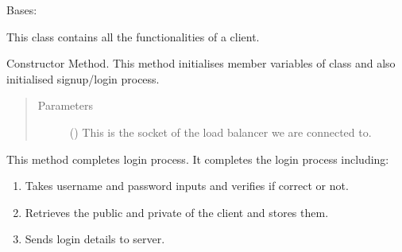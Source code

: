 \documentclass[letterpaper,10pt,english]{sphinxmanual}
\begin{document}
\begin{fulllineitems}
\label{\detokenize{clientHelper:clientHelper.Client}}
Bases: 

This class contains all the functionalities of a client.

\begin{fulllineitems}
\label{\detokenize{clientHelper:clientHelper.Client.__init__}}
Constructor Method.
This method initialises member variables of class and also initialised signup/login process.
\begin{quote}\begin{description}
\item[{Parameters}] \leavevmode
{} () \textendash{} This is the socket of the load balancer we are connected to.

\end{description}\end{quote}

\end{fulllineitems}


\begin{fulllineitems}
\label{\detokenize{clientHelper:clientHelper.Client.attemptLogin}}
This method completes login process.
It completes the login process including:
\begin{enumerate}
\def\theenumi{\arabic{enumi}}
\def\labelenumi{\theenumi .}
\makeatletter\def\p@enumii{\p@enumi \theenumi .}\makeatother
\item {} 
Takes username and password inputs and verifies if correct or not.

\item {} 
Retrieves the public and private of the client and stores them.

\item {} 
Sends login details to server.


\end{enumerate}
\end{fulllineitems}
\end{fulllineitems}
\end{document}
